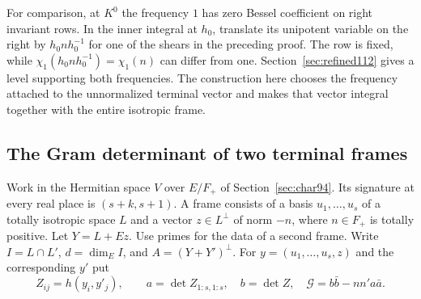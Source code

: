 \documentclass[a4paper,11pt]{article}
\theoremstyle{definition}
\theoremstyle{remark}
\numberwithin{equation}{section}
\begin{document}
For comparison, at \(K^0\) the frequency \(1\) has zero Bessel
coefficient on right invariant rows. In the inner integral at
\(h_0\), translate its unipotent variable on the right by
\(h_0 n h_0^{-1}\) for one of the shears in the preceding proof.
The row is fixed, while \(\chi_1(h_0nh_0^{-1})=\chi_1(n)\)
can differ from one. Section~\ref{sec:refined112} gives a level
supporting both frequencies. The construction here chooses the
frequency attached to the unnormalized terminal vector and makes
that vector integral together with the entire isotropic frame.

\subsection{The Gram determinant of two terminal frames}\label{nav:VII-01}
\label{sec:gram132}

Work in the Hermitian space \(V\) over \(E/F_+\) of
Section~\ref{sec:char94}. Its signature at every real place is
\((s+k,s+1)\). A frame consists of a basis \(u_1,\ldots,u_s\) of
a totally isotropic space \(L\) and a vector \(z\in L^\perp\)
of norm \(-n\), where \(n\in F_+\) is totally positive. Let
\(Y=L+Ez\). Use primes for the data of a second frame. Write
\(I=L\cap L'\), \(d=\dim_E I\), and \(A=(Y+Y')^\perp\).
For \(y=(u_1,\ldots,u_s,z)\) and the corresponding \(y'\) put
\[
 Z_{ij}=h(y_i,y'_j),\qquad
 a=\det Z_{1:s,1:s},\quad b=\det Z,\quad
 \mathcal G=b\bar b-nn'a\bar a .
\]
\end{document}

